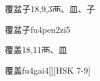 \begin{Entry}{覆盆子}{18,9,3}{⾑、⽫、⼦}
  \begin{Phonetics}{覆盆子}{fu4pen2zi5}
  \end{Phonetics}
\end{Entry}

\begin{Entry}{覆盖}{18,11}{⾑、⽫}
  \begin{Phonetics}{覆盖}{fu4gai4}[][HSK 7-9]
  \end{Phonetics}
\end{Entry}


